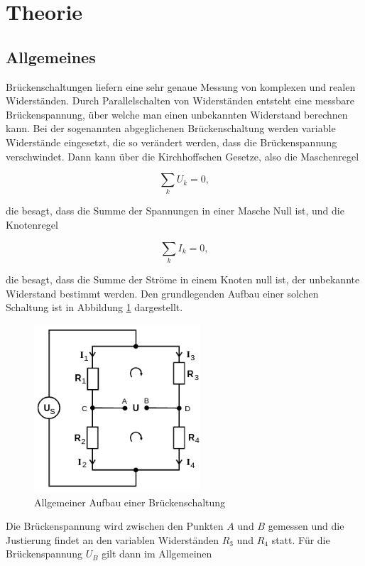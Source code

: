 \section{Theorie}
\label{sec:Theorie}


\subsection{Allgemeines}
Brückenschaltungen liefern eine sehr genaue Messung von komplexen und
realen Widerständen. Durch Parallelschalten von Widerständen entsteht eine
messbare Brückenspannung, über welche man einen unbekannten Widerstand
berechnen kann.
Bei der sogenannten abgeglichenen Brückenschaltung werden variable
Widerstände eingesetzt, die so verändert werden, dass die Brückenspannung
verschwindet.
Dann kann über die Kirchhoffschen Gesetze, also die Maschenregel

\begin{equation}
  \sum_k U_k = 0,
\end{equation}

die besagt, dass die Summe der Spannungen in einer Masche Null ist,
und die Knotenregel

\begin{equation}
  \sum_k I_k = 0,
\end{equation}

die besagt, dass die Summe der Ströme in einem Knoten null ist, der unbekannte
Widerstand bestimmt werden.
Den grundlegenden Aufbau einer solchen Schaltung ist in Abbildung
\ref{fig:AllgBr} dargestellt.

\begin{figure}[h]
  \centering
  \includegraphics[height=6.25cm]{AllgBr.png}
  \caption{Allgemeiner Aufbau einer Brückenschaltung \cite{anleitung}}
  \label{fig:AllgBr}
\end{figure}

Die Brückenspannung wird zwischen den Punkten $A$ und $B$ gemessen und die
Justierung findet an den variablen Widerständen $R_3$ und $R_4$ statt.
Für die Brückenspannung $U_B$ gilt dann im Allgemeinen

